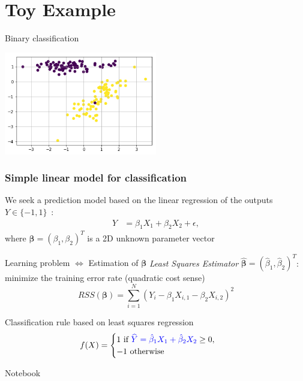 \documentclass[pressentation,9pt,aspectratio=1610,xcolor=table]{beamer}
\newcommand{\structuretext}[1]{{\textcolor{blue}{#1}}}
\begin{document}
\section{Toy Example}

\begin{frame}{Binary classification}
  \begin{center}
    \includegraphics[width=0.5\textwidth]{academic_linear.png}
  \end{center}
\end{frame}
  
\begin{frame}
  \frametitle{Simple linear model for classification}
  We seek a prediction model based on the linear regression of the outputs 
  $Y \in \{-1,1\}$~:
  \begin{align*}
    Y & = \beta_1 X_1 + \beta_2 X_2 + \epsilon,
  \end{align*}
  where $\boldsymbol{\beta}=(\beta_1, \beta_2)^T $ is a 2D unknown parameter vector 
  
  \begin{block}{Learning problem $\Leftrightarrow$ Estimation of $\boldsymbol{\beta}$}
    {\it Least Squares Estimator} $\hat{\boldsymbol{\beta}}=(\hat{\beta}_1, \hat{\beta}_2)^T $: 
    minimize the training error rate (quadratic cost sense)
    $$
    RSS ( \boldsymbol{\beta} )= \sum_{i=1}^N (Y_i - \beta_1 X_{i,1} - \beta_2 X_{i,2} )^2
    $$
  \end{block}
  
  
  \begin{block}{Classification rule based on least squares regression}
    \vspace{-2mm}
    \begin{align*}
      f(X) &= \begin{cases}
        1\text{ if } \structuretext{\widehat{Y}= \hat{\beta}_1 X_1 + \hat{\beta}_2 X_2} \ge 0,\\
        -1 \text{ otherwise}
      \end{cases}
    \end{align*}
  \end{block}

  \alert{Notebook}
\end{frame}
  
\end{document}
